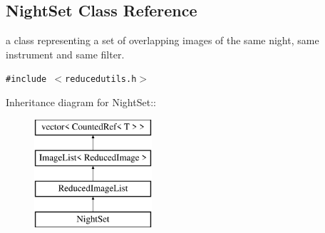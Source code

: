 \subsection{Night\-Set  Class Reference}
\label{class_nightset}
a class representing a set of overlapping images of the same night, same instrument and same filter. 


{\tt \#include $<$reducedutils.h$>$}

Inheritance diagram for Night\-Set::\begin{figure}[H]
\begin{center}
\leavevmode
\includegraphics[height=4cm]{class_nightset}
\end{center}
\end{figure}
